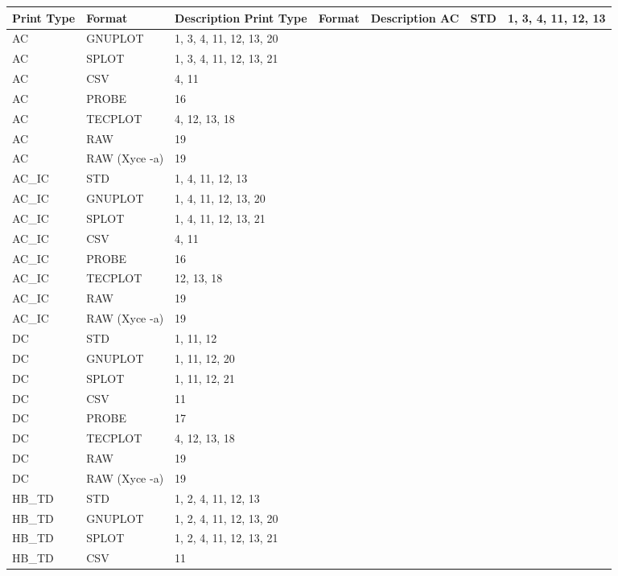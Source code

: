 {
\renewcommand{\arraystretch}{1.2}
\begin{longtable}{>{\ttfamily\small}m{1in}<{\normalfont\small}>{\ttfamily\small}m{1.5in}<{\normalfont\footnotesize}m{2.25in}@{}}
  \color{white}\normalfont\bf Print Type &
  \color{white}\bf Format &
  \color{white}\bf Description \endfirsthead
  \color{white}\normalfont\bf Print Type &
  \color{white}\bf Format &
  \color{white}\bf Description \endhead
AC & STD & 1, 3, 4, 11, 12, 13 \\ \hline
AC & GNUPLOT & 1, 3, 4, 11, 12, 13, 20 \\ \hline
AC & SPLOT & 1, 3, 4, 11, 12, 13, 21 \\ \hline
AC & CSV & 4, 11 \\ \hline
AC & PROBE & 16 \\ \hline
AC & TECPLOT & 4, 12, 13, 18 \\ \hline
AC & RAW & 19 \\ \hline
AC & RAW (Xyce -a) & 19 \\ \hline
AC\_IC & STD & 1, 4, 11, 12, 13 \\ \hline
AC\_IC & GNUPLOT & 1, 4, 11, 12, 13, 20 \\ \hline
AC\_IC & SPLOT & 1, 4, 11, 12, 13, 21 \\ \hline
AC\_IC & CSV & 4, 11 \\ \hline
AC\_IC & PROBE & 16 \\ \hline
AC\_IC & TECPLOT & 12, 13, 18 \\ \hline
AC\_IC & RAW & 19 \\ \hline
AC\_IC & RAW (Xyce -a) & 19 \\ \hline
DC & STD & 1, 11, 12 \\ \hline
DC & GNUPLOT & 1, 11, 12, 20 \\ \hline
DC & SPLOT & 1, 11, 12, 21 \\ \hline
DC & CSV & 11 \\ \hline
DC & PROBE & 17 \\ \hline
DC & TECPLOT & 4, 12, 13, 18 \\ \hline
DC & RAW & 19 \\ \hline
DC & RAW (Xyce -a) & 19 \\ \hline
HB\_TD & STD & 1, 2, 4, 11, 12, 13 \\ \hline
HB\_TD & GNUPLOT & 1, 2, 4, 11, 12, 13, 20 \\ \hline
HB\_TD & SPLOT & 1, 2, 4, 11, 12, 13, 21 \\ \hline
HB\_TD & CSV & 11 \\ \hline

\end{longtable}}
